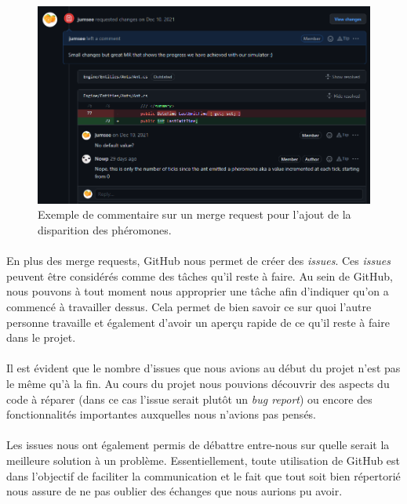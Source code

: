 \documentclass{EPUProjetDi}
\begin{document}
\begin{figure}[h!]
\centering
\includegraphics[scale=.5]{merge_request.png}
\caption{Exemple de commentaire sur un merge request pour l'ajout de la disparition des phéromones.}
\label{fig:MergeRequest}
\end{figure}

\paragraph{}
En plus des merge requests, GitHub nous permet de créer des \textit{issues}.
Ces \textit{issues} peuvent être considérés comme des tâches qu'il reste à faire. Au sein de GitHub, nous
pouvons à tout moment nous approprier une tâche afin d'indiquer qu'on a commencé à travailler dessus. Cela 
permet de bien savoir ce sur quoi l'autre personne travaille et également d'avoir un aperçu rapide de ce qu'il reste à faire dans le projet.

\paragraph{}
Il est évident que le nombre d'issues que nous avions au début du projet n'est pas le même qu'à la fin. Au cours du projet nous
pouvions découvrir des aspects du code à réparer (dans ce cas l'issue serait plutôt un \textit{bug report}) ou encore des fonctionnalités
importantes auxquelles nous n'avions pas pensés.

\paragraph{}
Les issues nous ont également permis de débattre entre-nous sur quelle serait la meilleure solution à un problème. Essentiellement, toute utilisation
de GitHub est dans l'objectif de faciliter la communication et le fait que tout soit bien répertorié nous assure de ne pas oublier des échanges que 
nous aurions pu avoir.
\end{document}
